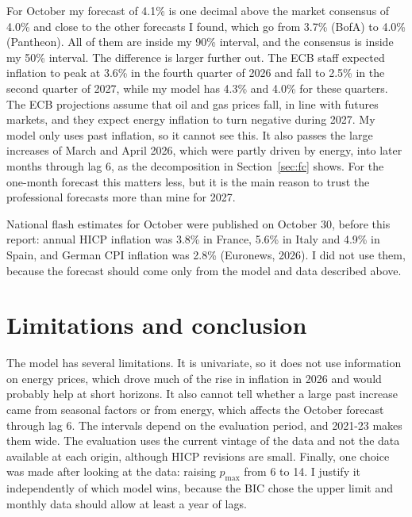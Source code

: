 \documentclass[11pt]{article}
\begin{document}
For October my forecast of 4.1\% is one decimal above the market consensus of 4.0\% and close to the other forecasts I found, which go from 3.7\% (BofA) to 4.0\% (Pantheon). All of them are inside my 90\% interval, and the consensus is inside my 50\% interval. The difference is larger further out. The ECB staff expected inflation to peak at 3.6\% in the fourth quarter of 2026 and fall to 2.5\% in the second quarter of 2027, while my model has 4.3\% and 4.0\% for these quarters. The ECB projections assume that oil and gas prices fall, in line with futures markets, and they expect energy inflation to turn negative during 2027. My model only uses past inflation, so it cannot see this. It also passes the large increases of March and April 2026, which were partly driven by energy, into later months through lag 6, as the decomposition in Section~\ref{sec:fc} shows. For the one-month forecast this matters less, but it is the main reason to trust the professional forecasts more than mine for 2027.

National flash estimates for October were published on October 30, before this report: annual HICP inflation was 3.8\% in France, 5.6\% in Italy and 4.9\% in Spain, and German CPI inflation was 2.8\% (Euronews, 2026). I did not use them, because the forecast should come only from the model and data described above.

\section{Limitations and conclusion}
\label{sec:concl}

The model has several limitations. It is univariate, so it does not use information on energy prices, which drove much of the rise in inflation in 2026 and would probably help at short horizons. It also cannot tell whether a large past increase came from seasonal factors or from energy, which affects the October forecast through lag 6. The intervals depend on the evaluation period, and 2021-23 makes them wide. The evaluation uses the current vintage of the data and not the data available at each origin, although HICP revisions are small. Finally, one choice was made after looking at the data: raising $p_{\max}$ from 6 to 14. I justify it independently of which model wins, because the BIC chose the upper limit and monthly data should allow at least a year of lags.
\end{document}
